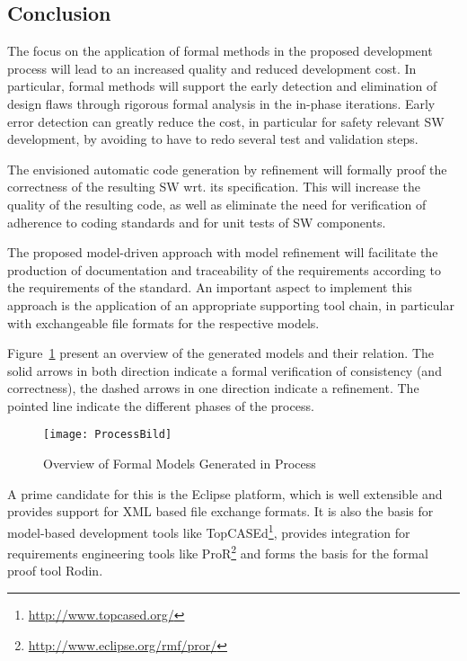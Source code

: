 \subsection{Conclusion}
\label{sec:conclusion-fm-process}

The focus on the application of formal methods in the proposed development
process will lead to an increased quality and reduced development cost. In
particular, formal methods will support the early detection and elimination of
design flaws through rigorous formal analysis in the in-phase iterations. Early
error detection can greatly reduce the cost, in particular for safety relevant
SW development, by avoiding to have to redo several test and validation steps.

The envisioned automatic code generation by refinement will formally proof the
correctness of the resulting SW wrt. its specification. This will increase the
quality of the resulting code, as well as eliminate the need for verification of
adherence to coding standards and for unit tests of SW components.

The proposed model-driven approach with model refinement will facilitate the
production of documentation and traceability of the requirements according to
the requirements of the standard. An important aspect to implement this approach
is the application of an appropriate supporting tool chain, in particular with
exchangeable file formats for the respective models.

Figure~\ref{fig:overview-models-process} present an overview of the generated
models and their relation. The solid arrows in both direction indicate a formal
verification of consistency (and correctness), the dashed arrows in one
direction indicate a refinement. The pointed line indicate the different phases
of the process.

\begin{figure}[ht]
  \centering
  \texttt{[image: ProcessBild]}
  \caption{Overview of Formal Models Generated in Process}
  \label{fig:overview-models-process}
\end{figure}

A prime candidate for this is the Eclipse platform, which is well extensible and
provides support for XML based file exchange formats. It is also the basis for
model-based development tools like
TopCASEd\footnote{\url{http://www.topcased.org/}}, provides integration for
requirements engineering tools like
ProR\footnote{\url{http://www.eclipse.org/rmf/pror/}} and forms the basis for
the formal proof tool Rodin.


